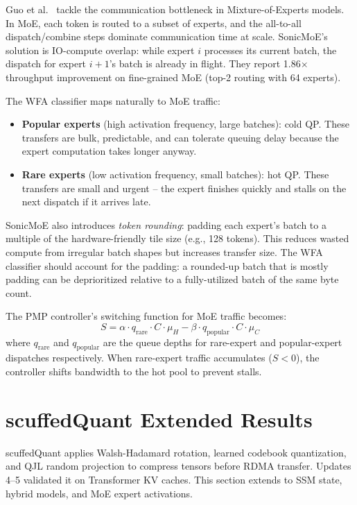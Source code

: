 \documentclass[11pt,letterpaper]{article}
\begin{document}
Guo et al.~\cite{guo2026sonicmoe} tackle the communication bottleneck in Mixture-of-Experts models. In MoE, each token is routed to a subset of experts, and the all-to-all dispatch/combine steps dominate communication time at scale. SonicMoE's solution is IO-compute overlap: while expert $i$ processes its current batch, the dispatch for expert $i{+}1$'s batch is already in flight. They report 1.86$\times$ throughput improvement on fine-grained MoE (top-2 routing with 64 experts).

The WFA classifier maps naturally to MoE traffic:

\begin{itemize}
\item \textbf{Popular experts} (high activation frequency, large batches): cold QP. These transfers are bulk, predictable, and can tolerate queuing delay because the expert computation takes longer anyway.
\item \textbf{Rare experts} (low activation frequency, small batches): hot QP. These transfers are small and urgent -- the expert finishes quickly and stalls on the next dispatch if it arrives late.
\end{itemize}

SonicMoE also introduces \emph{token rounding}: padding each expert's batch to a multiple of the hardware-friendly tile size (e.g., 128 tokens). This reduces wasted compute from irregular batch shapes but increases transfer size. The WFA classifier should account for the padding: a rounded-up batch that is mostly padding can be deprioritized relative to a fully-utilized batch of the same byte count.

The PMP controller's switching function for MoE traffic becomes:
\[
S = \alpha \cdot q_{\text{rare}} \cdot C \cdot \mu_H - \beta \cdot q_{\text{popular}} \cdot C \cdot \mu_C
\]
where $q_{\text{rare}}$ and $q_{\text{popular}}$ are the queue depths for rare-expert and popular-expert dispatches respectively. When rare-expert traffic accumulates ($S < 0$), the controller shifts bandwidth to the hot pool to prevent stalls.

\section{scuffedQuant Extended Results}
\label{sec:scuffedquant_ext}

scuffedQuant applies Walsh-Hadamard rotation, learned codebook quantization, and QJL random projection to compress tensors before RDMA transfer. Updates 4--5 validated it on Transformer KV caches. This section extends to SSM state, hybrid models, and MoE expert activations.
\end{document}
